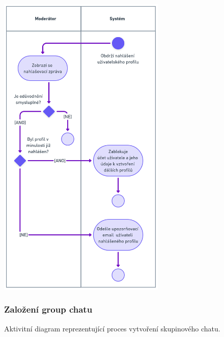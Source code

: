 \documentclass[czech,12pt,a4paper,titlepage]{article}
\begin{document}
\bigskip
\bigskip
\bigskip
\bigskip
\bigskip
\bigskip

\includegraphics[width=0.6\textwidth, center]{Activity_diagram_2.png}

\clearpage

\subsubsection{Založení group chatu}

Aktivitní diagram reprezentující proces vytvoření skupinového chatu.

\bigskip
\bigskip
\bigskip
\bigskip
\bigskip
\bigskip
\end{document}
